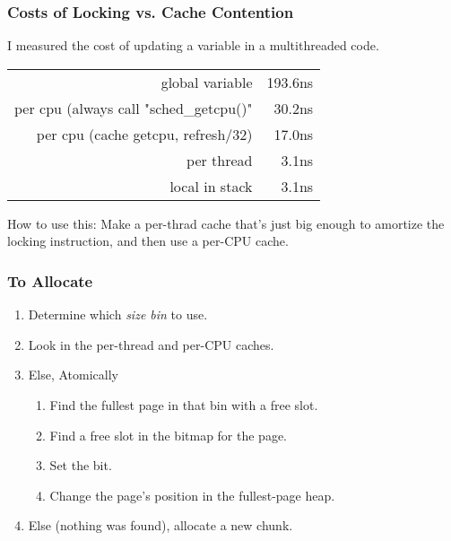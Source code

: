 \documentclass[xcolor=dvipsnames,14pt]{beamer}
\begin{document}
\begin{frame}[fragile]
\frametitle{Costs of Locking vs. Cache Contention}

I measured the cost of updating a variable in a multithreaded code.

\begin{tabular}{rr}
                                                  global variable &    193.6ns \\
            per cpu (always call "sched_getcpu()"  &     30.2ns \\
per cpu (cache getcpu, refresh/32) &     17.0ns \\
                                                      per thread &      3.1ns \\
                                                  local in stack &      3.1ns \\
\end{tabular}

How to use this:  Make a per-thrad cache that's just big enough to amortize the locking instruction, and then use a per-CPU cache.
\end{frame}

\begin{frame}
\frametitle{To Allocate}


\begin{enumerate}
\item Determine which \textit{size bin} to use.
\item Look in the per-thread and per-CPU caches.
\item Else, Atomically 
  \begin{enumerate}
  \item Find the fullest page in that bin with a free slot.
  \item Find a free slot in the bitmap for the page.
  \item Set the bit.
  \item Change the page's position in the fullest-page heap.
  \end{enumerate}
\item Else (nothing was found), allocate a new chunk.
\end{enumerate}
\end{frame}
\end{document}
